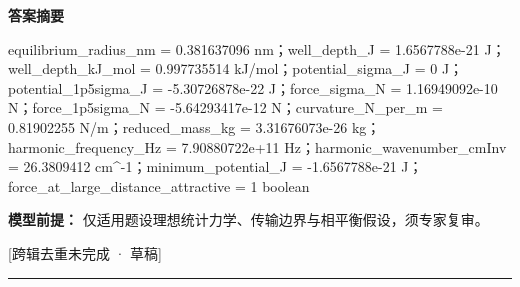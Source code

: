 \documentclass[UTF8,11pt,a4paper]{ctexart}
\begin{document}
\noindent\textbf{答案摘要}\par
equilibrium\_radius\_nm = 0.381637096 nm；well\_depth\_J = 1.6567788e-21 J；well\_depth\_kJ\_mol = 0.997735514 kJ/mol；potential\_sigma\_J = 0 J；potential\_1p5sigma\_J = -5.30726878e-22 J；force\_sigma\_N = 1.16949092e-10 N；force\_1p5sigma\_N = -5.64293417e-12 N；curvature\_N\_per\_m = 0.81902255 N/m；reduced\_mass\_kg = 3.31676073e-26 kg；harmonic\_frequency\_Hz = 7.90880722e+11 Hz；harmonic\_wavenumber\_cmInv = 26.3809412 cm\textasciicircum{}-1；minimum\_potential\_J = -1.6567788e-21 J；force\_at\_large\_distance\_attractive = 1 boolean\par
\noindent\textbf{模型前提：}
仅适用题设理想统计力学、传输边界与相平衡假设，须专家复审。\par
\noindent\textcolor{red!65!black}{[跨辑去重未完成 · 草稿]} \par
\medskip\hrule\medskip
{}
\end{document}
